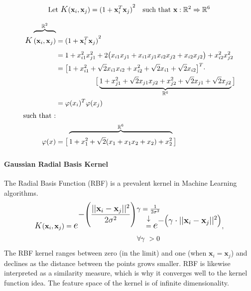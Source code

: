 	\begin{equation}
		\begin{aligned}
			&\text{Let   } \mathlarger{K}(\textbf{x}_i,\textbf{x}_j) = {(1 + \textbf{x}_i^T \textbf{x}_j)}^2 
			&\text{such that   } \textbf{x}: \mathbb{R}^2 \Rightarrow \mathbb{R}^6
		\end{aligned}
		\label{svm_poly_kernel_R2}
	\end{equation}
	
	\begin{equation}
		\begin{split}
			\mathlarger{K} \xoverbrace{(\textbf{x}_i,\textbf{x}_j)}^{\mathbb{R}^2}
			&= {(1 + \textbf{x}_i^T \textbf{x}_j)}^2 \\
			& = 1+ x_{i1}^2 x_{j1}^2 
			+ 2 \big(x_{i1}x_{j1} +  x_{i1}x_{j1}x_{i2}x_{j2} + x_{i2}x_{j2}\big) 
			+ x_{i2}^2 x_{j2}^2 \\ 
			& = \big[
				1 + x_{i1}^2 + \sqrt{2}x_{i1}x_{i2} + x_{i2}^2 + \sqrt{2}x_{i1} + \sqrt{2}x_{i2}
			\big]^T
			\cdot \\
			&\hspace{2cm} \big[
				\underbrace{1 + x_{j1}^2 + \sqrt{2}x_{j1}x_{j2} + x_{j2}^2 + \sqrt{2}x_{j1} + \sqrt{2}x_{j2}}_{\mathbb{R}^6}
			\big] \\
			&= \varphi(x_i)^T\varphi(x_j) \\ 
			\text{such that :}&\\
			 \varphi(x) &= \big[
				 \xoverbrace{1 + x_1^2  + \sqrt{2}(x_1 + x_1x_2 + x_2) + x_2^2}^{\mathbb{R}^6}
			 \big]
		\end{split}
		\raisetag{2\normalbaselineskip}
		\label{svm_poly_kernal_proof}
	\end{equation}
	
\paragraph{Gaussian Radial Basis Kernel}
	The Radial Basis Function (RBF) is a prevalent kernel in Machine Learning algorithms.
	\begin{equation}
		 \begin{aligned}
			\mathlarger{K}(\textbf{x}_i,\textbf{x}_j) = \mathlarger{\mathlarger{e}}^{
				\displaystyle  -\Bigg(
				\frac{||\textbf{x}_i - \textbf{x}_j||^2}{2 \sigma^2}
				\Bigg)}& \ \ \
			\overset{\mathclap{\tikz \node {$\downarrow$} node [above=1ex] {$\gamma = \frac{1}{2\sigma^2}$};}}{=}
			\mathlarger{\mathlarger{e}}^{\displaystyle  -\big(
				\gamma \cdot ||\textbf{x}_i - \textbf{x}_j||^2
				\big)}, \\
			& \forall \gamma \ > 0 
		 \end{aligned}
	\end{equation}
	The RBF kernel ranges between zero (in the limit) and one (when $\textbf{x}_i = \textbf{x}_j$) and declines as the distance between the points grows smaller. RBF is likewise interpreted as a similarity measure, which is why it converges well to the kernel function idea. The feature space of the kernel is of infinite dimensionality.
	

